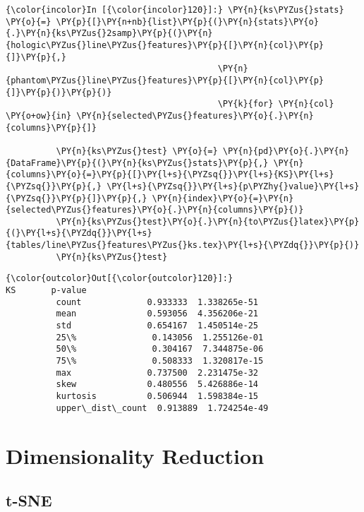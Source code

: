     \begin{Verbatim}[commandchars=\\\{\}]
{\color{incolor}In [{\color{incolor}120}]:} \PY{n}{ks\PYZus{}stats} \PY{o}{=} \PY{p}{[}\PY{n+nb}{list}\PY{p}{(}\PY{n}{stats}\PY{o}{.}\PY{n}{ks\PYZus{}2samp}\PY{p}{(}\PY{n}{hologic\PYZus{}line\PYZus{}features}\PY{p}{[}\PY{n}{col}\PY{p}{]}\PY{p}{,}
                                          \PY{n}{phantom\PYZus{}line\PYZus{}features}\PY{p}{[}\PY{n}{col}\PY{p}{]}\PY{p}{)}\PY{p}{)}
                                          \PY{k}{for} \PY{n}{col} \PY{o+ow}{in} \PY{n}{selected\PYZus{}features}\PY{o}{.}\PY{n}{columns}\PY{p}{]}

          \PY{n}{ks\PYZus{}test} \PY{o}{=} \PY{n}{pd}\PY{o}{.}\PY{n}{DataFrame}\PY{p}{(}\PY{n}{ks\PYZus{}stats}\PY{p}{,} \PY{n}{columns}\PY{o}{=}\PY{p}{[}\PY{l+s}{\PYZsq{}}\PY{l+s}{KS}\PY{l+s}{\PYZsq{}}\PY{p}{,} \PY{l+s}{\PYZsq{}}\PY{l+s}{p\PYZhy{}value}\PY{l+s}{\PYZsq{}}\PY{p}{]}\PY{p}{,} \PY{n}{index}\PY{o}{=}\PY{n}{selected\PYZus{}features}\PY{o}{.}\PY{n}{columns}\PY{p}{)}
          \PY{n}{ks\PYZus{}test}\PY{o}{.}\PY{n}{to\PYZus{}latex}\PY{p}{(}\PY{l+s}{\PYZdq{}}\PY{l+s}{tables/line\PYZus{}features\PYZus{}ks.tex}\PY{l+s}{\PYZdq{}}\PY{p}{)}
          \PY{n}{ks\PYZus{}test}
\end{Verbatim}

            \begin{Verbatim}[commandchars=\\\{\}]
{\color{outcolor}Out[{\color{outcolor}120}]:}                         KS       p-value
          count             0.933333  1.338265e-51
          mean              0.593056  4.356206e-21
          std               0.654167  1.450514e-25
          25\%               0.143056  1.255126e-01
          50\%               0.304167  7.344875e-06
          75\%               0.508333  1.320817e-15
          max               0.737500  2.231475e-32
          skew              0.480556  5.426886e-14
          kurtosis          0.506944  1.598384e-15
          upper\_dist\_count  0.913889  1.724254e-49
\end{Verbatim}

    \section{Dimensionality Reduction}\label{dimensionality-reduction}

\subsection{t-SNE}\label{t-sne}

